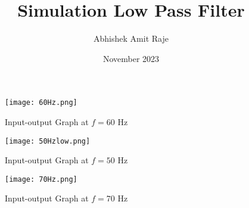 \documentclass{article}
\title{Simulation Low Pass Filter}
\author{Abhishek Amit Raje}
\date{November 2023}
\begin{document}
\maketitle

\begin{figure}
    \centering
    \texttt{[image: 60Hz.png]}
    \caption{Input-output Graph at $f=60$ Hz}
    \label{fig:50Hz}
\end{figure}

\begin{figure}
    \centering
    \texttt{[image: 50Hzlow.png]}
    \caption{Input-output Graph at $f=50$ Hz}
    \label{fig:1Hz}
\end{figure}

\begin{figure}
    \centering
    \texttt{[image: 70Hz.png]}
    \caption{Input-output Graph at $f=70$ Hz}
    \label{fig:100Hz}
\end{figure}
\end{document}

